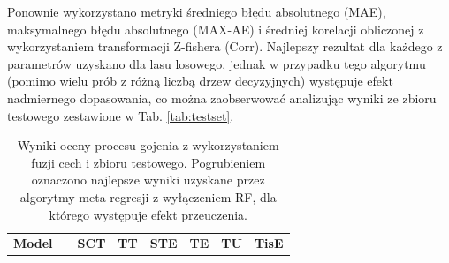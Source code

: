 Ponownie wykorzystano metryki średniego błędu absolutnego (MAE), maksymalnego błędu absolutnego (MAX-AE) i średniej korelacji obliczonej z wykorzystaniem transformacji Z-fishera (Corr). Najlepszy rezultat dla każdego z parametrów uzyskano dla lasu losowego, jednak w przypadku tego algorytmu (pomimo wielu prób z różną liczbą drzew decyzyjnych) występuje efekt nadmiernego dopasowania, co można zaobserwować analizując wyniki ze zbioru testowego zestawione w Tab. \ref{tab:testset}. 

\begin{table}[]
	\caption{Wyniki oceny procesu gojenia z wykorzystaniem fuzji cech i zbioru testowego. Pogrubieniem oznaczono najlepsze wyniki uzyskane przez algorytmy meta-regresji z wyłączeniem RF, dla którego występuje efekt przeuczenia.}
	\scriptsize
	\begin{center}
		\begin{tabular}{lc||c|c|c|c|c|c}
			\textbf{Model} & & \textbf{SCT} & \textbf{TT} & \textbf{STE} & \textbf{TE} & \textbf{TU} & \textbf{TisE}\\ 
			

\end{tabular}
\end{center}
\end{table}
